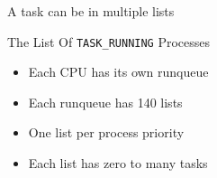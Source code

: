 \begin{frame}
  \begin{block}{A task can be in multiple lists}
    \begin{center}
    \end{center}
  \end{block}
\end{frame}

\begin{frame}[fragile=singleslide]{The List Of \texttt{TASK\_RUNNING} Processes}
  \begin{varwidth}{.69\textwidth}
    \begin{itemize}
    \item Each CPU has its own runqueue
    \item Each runqueue has 140 lists
    \item One list per process priority
    \item Each list has zero to many tasks
    \end{itemize}
  \end{varwidth}\hfill
  \begin{varwidth}{.3\textwidth}
    \begin{center}
    \end{center}
  \end{varwidth}
  \vspace{2em}
  \begin{center}
    \begin{varwidth}{.5\textwidth}
      \inputminted{c}{../figs/run-list.c}
    \end{varwidth}
  \end{center}
\end{frame}

